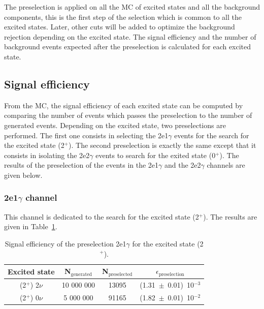 \documentclass[main.tex]{subfiles}
\begin{document}
\bigskip


\NI The preselection is applied on all the MC of excited states and all the background components, this is the first step of the selection which is common to all the excited states. Later, other cuts will be added to optimize the background rejection depending on the excited state. The signal efficiency and the number of background events expected after the preselection is calculated for each excited state.


\subsection{Signal efficiency}

 
\NI From the MC, the signal efficiency of each excited state can be computed by comparing the number of events which passes the preselection to the number of generated events. Depending on the excited state, two preselections are performed. The first one consists in selecting the 2e1$\gamma$ events for the search for the excited state (2$^+$). The second preselection is exactly the same except that it consists in isolating the 2e2$\gamma$ events to search for the exited state (0$^+$). The results of the preselection of the events in the 2e1$\gamma$ and the 2e2$\gamma$ channels are given below. 


\subsubsection{2e1$\gamma$ channel}


\NI This channel is dedicated to the search for the excited state (2$^+$). The results are given in Table~\ref{EffPreselection2PLUS}.


\begin{table}[h!]
\begin{center}
\begin{tabular}{c|c|c|c}
\toprule
Excited state & N$_\text{{generated}}$ & N$_\text{{preselected}}$ & $\epsilon_\text{{preselection}}$ \\[0.1cm]
\midrule
(2$^+$) 2$\nu$ &  10 000 000 & 13095 & (1.31~$\pm$~0.01)~10$^{-\text{3}}$\\[0.1cm]
(2$^+$) 0$\nu$ &   5 000 000 & 91165 & (1.82~$\pm$~0.01)~10$^{-\text{2}}$\\[0.1cm]
\bottomrule
\end{tabular}
\caption{Signal efficiency of the preselection 2e1$\gamma$ for the excited state (2$^+$).}
\label{EffPreselection2PLUS}
\end{center}
\end{table}
\end{document}
